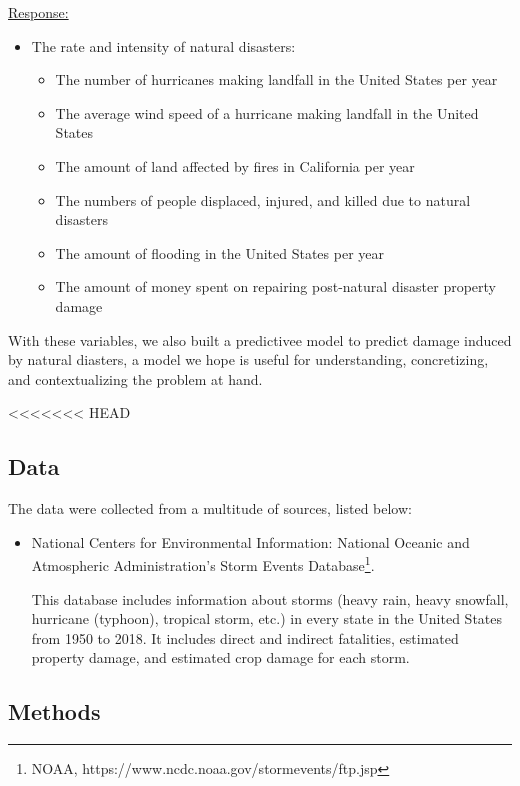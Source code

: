 \documentclass[10pt,]{article}
\let\rmarkdownfootnote\footnote%
\def\footnote{\protect\rmarkdownfootnote}
\begin{document}
\underline{Response:}

\begin{itemize}
  \item The rate and intensity of natural disasters:
  \begin{itemize}
    \item The number of hurricanes making landfall in the United States per year
    \item The average wind speed of a hurricane making landfall in the United States
    \item The amount of land affected by fires in California per year
    \item The numbers of people displaced, injured, and killed due to natural disasters
    \item The amount of flooding in the United States per year
    \item The amount of money spent on repairing post-natural disaster property damage
  \end{itemize}
\end{itemize}

With these variables, we also built a predictivee model to predict
damage induced by natural diasters, a model we hope is useful for
understanding, concretizing, and contextualizing the problem at hand.

<<<<<<< HEAD
\subsection{Data}\label{data}

The data were collected from a multitude of sources, listed below:

\begin{itemize}
  \item National Centers for Environmental Information: National Oceanic and Atmospheric Administration's Storm Events Database\footnote{NOAA, https://www.ncdc.noaa.gov/stormevents/ftp.jsp}.
  
  This database includes information about storms (heavy rain, heavy snowfall, hurricane (typhoon), tropical storm, etc.) in every state in the United States from 1950 to 2018. It includes direct and indirect fatalities, estimated property damage, and estimated crop damage for each storm.
\end{itemize}

\subsection{Methods}\label{methods}
\end{document}
